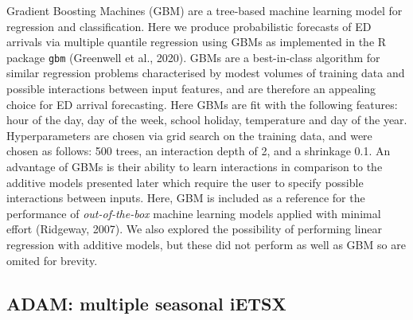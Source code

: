 \documentclass[]{elsarticle} %
\begin{document}
Gradient Boosting Machines (GBM) are a tree-based machine learning model
for regression and classification. Here we produce probabilistic
forecasts of ED arrivals via multiple quantile regression using GBMs as
implemented in the R package \texttt{gbm} (Greenwell et al., 2020). GBMs are a
best-in-class algorithm for similar regression problems characterised by
modest volumes of training data and possible interactions between input
features, and are therefore an appealing choice for ED arrival
forecasting. Here GBMs are fit with the following features: hour of the
day, day of the week, school holiday, temperature and day of the year.
Hyperparameters are chosen via grid search on the training data, and
were chosen as follows: 500 trees, an interaction depth of 2, and a
shrinkage 0.1. An advantage of GBMs is their ability to learn
interactions in comparison to the additive models presented later which
require the user to specify possible interactions between inputs. Here, GBM is included as a reference for the performance of \emph{out-of-the-box}
machine learning models applied with minimal effort (Ridgeway, 2007). We also explored
the possibility of performing linear regression with additive models,
but these did not perform as well as GBM so are omited for brevity.

\hypertarget{adam-multiple-seasonal-ietsx}{%
\subsection{ADAM: multiple seasonal iETSX}\label{adam-multiple-seasonal-ietsx}}
\end{document}
